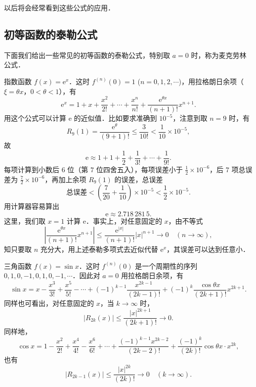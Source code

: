 以后将会经常看到这些公式的应用．

\subsection{初等函数的泰勒公式}\label{subsec:8-1-3}

下面我们给出一些常见的初等函数的泰勒公式，特别取 $a = 0$ 时，称为麦克劳林公式．

指数函数 $f(x) = \mathrm{e}^x$．这时 $f^{(n)}(0) = 1$ ($n = 0, 1, 2, \cdots$)，用拉格朗日余项（$\xi = \theta x$，$0 < \theta < 1$），有
\[
\mathrm{e}^x = 1 + x + \frac{x^2}{2!} + \cdots + \frac{x^n}{n!} + \frac{\mathrm{e}^{\theta x}}{(n+1)!}x^{n+1}.
\]
用这个公式可以计算 $\mathrm{e}$ 的近似值．比如要求准确到 $10^{-5}$，注意到取 $n = 9$ 时，有
\[
R_9(1) = \frac{\mathrm{e}^\theta}{(9+1)!} \leqslant \frac{3}{10!} < \frac{1}{10}\times 10^{-5},
\]
故
\[
\mathrm{e} \approx 1 + 1 + \frac{1}{2} + \frac{1}{3!} + \cdots + \frac{1}{9!}.
\]
每项计算到小数后 $6$ 位（第 $7$ 位四舍五入），每项误差小于 $\frac{1}{2}\times 10^{-6}$，后 $7$ 项总误差为 $\frac{7}{2}\times 10^{-6}$，再加上余项 $R_9(1)$ 的误差，总误差
\[
\text{总误差} < \left(\frac{7}{20} + \frac{1}{10}\right)\times 10^{-5} < \frac{1}{2}\times 10^{-5}.
\]
用计算器容易算出
\[
\mathrm{e} \approx 2.718\,281\,5.
\]
这里，我们取 $x = 1$ 计算 $\mathrm{e}$．事实上，对任意固定的 $x$，由不等式
\[
\left|\frac{\mathrm{e}^{\theta x}}{(n+1)!}x^{n+1}\right| \leqslant \frac{\mathrm{e}^{|x|}}{(n+1)!}|x|^{n+1} \to 0 \quad (n \to \infty),
\]
知只要取 $n$ 充分大，用上述泰勒多项式去近似代替 $\mathrm{e}^x$，其误差可以达到任意小．

三角函数 $f(x) = \sin x$．这时 $f^{(n)}(0)$ 是一个周期性的序列 $0, 1, 0, -1, 0, 1, 0, -1, \cdots$．因此对 $a = 0$ 用拉格朗日余项，有
\[
\sin x = x - \frac{x^3}{3!} + \frac{x^5}{5!} - \cdots + (-1)^{k-1}\frac{x^{2k-1}}{(2k-1)!} + (-1)^k \frac{\cos \theta x}{(2k+1)!}x^{2k+1}.
\]
同样也可看出，对任意固定的 $x$，当 $k \to \infty$ 时，
\[
|R_{2k}(x)| \leqslant \frac{|x|^{2k+1}}{(2k+1)!} \to 0.
\]
同样地，
\[
\cos x = 1 - \frac{x^2}{2!} + \frac{x^4}{4!} - \frac{x^6}{6!} + \cdots + \frac{(-1)^{k-1}x^{2k-2}}{(2k-2)!} + \frac{(-1)^k}{(2k)!}\cos \theta x\cdot x^{2k},
\]
也有
\[
|R_{2k-1}(x)| \leqslant \frac{|x|^{2k}}{(2k)!} \to 0 \quad (k \to \infty).
\]

